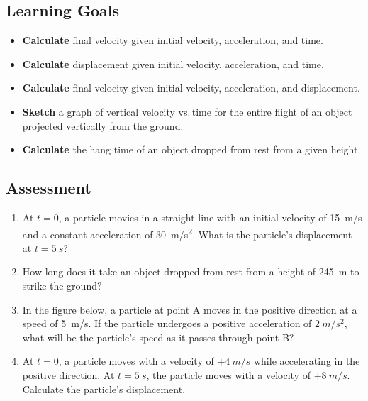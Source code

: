 \documentclass[dvipsnames]{article}
\begin{document}
\subsection*{Learning Goals}

\begin{itemize}[itemsep=0pt]
    \item \textbf{Calculate} final velocity given initial velocity, acceleration, and time.
    \item \textbf{Calculate} displacement given initial velocity, acceleration, and time.
    \item \textbf{Calculate} final velocity given initial velocity, acceleration, and displacement.
    \item \textbf{Sketch} a graph of vertical velocity vs.\,time for the entire flight of an object projected vertically from the ground.
    \item \textbf{Calculate} the hang time of an object dropped from rest from a given height.
\end{itemize}


\subsection*{Assessment}

\begin{enumerate}[itemsep=0pt]
\item At $t=0$, a particle movies in a straight line with an initial velocity of \SI{15}{m/s} and a constant acceleration of \SI{30}{m/s^2}. What is the particle's displacement at $t = \SI{5}{s}$?

\item How long does it take an object dropped from rest from a height of \SI{245}{m} to strike the ground?

\item In the figure below, a particle at point A moves in the positive direction at a speed of \SI{5}{m/s}. If the particle undergoes a positive acceleration of $\SI{2}{m/s^2}$, what will be the particle's speed as it passes through point B?

\begin{center}
\end{center}

\item At $t=0$, a particle moves with a velocity of $+\SI{4}{m/s}$ while accelerating in the positive direction. At $t = \SI{5}{s}$, the particle moves with a velocity of $+\SI{8}{m/s}$. Calculate the particle's displacement.
\end{enumerate}
\end{document}
